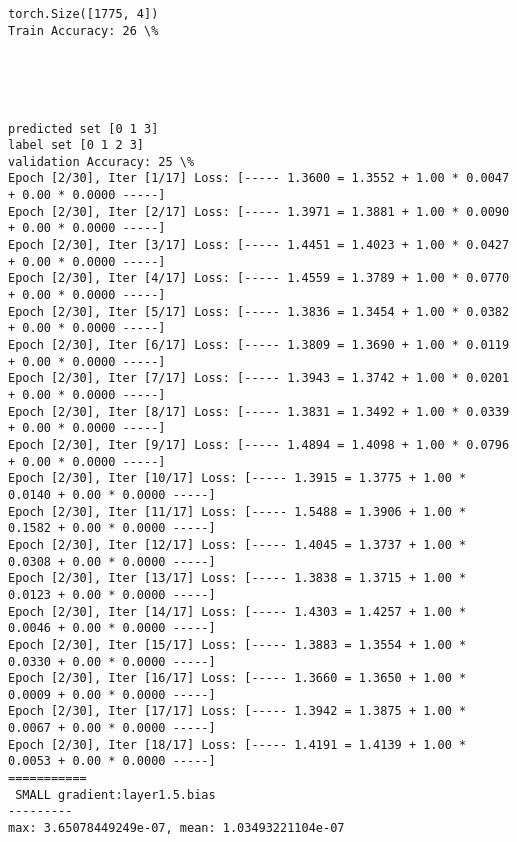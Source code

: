 \documentclass[11pt]{article}
\begin{document}
    \begin{Verbatim}[commandchars=\\\{\}]
torch.Size([1775, 4])
Train Accuracy: 26 \%

    \end{Verbatim}

    \begin{center}
    \end{center}
    { \hspace*{\fill} \\}
    
    \begin{center}
    \end{center}
    { \hspace*{\fill} \\}
    
    \begin{Verbatim}[commandchars=\\\{\}]
predicted set [0 1 3]
label set [0 1 2 3]
validation Accuracy: 25 \%
Epoch [2/30], Iter [1/17] Loss: [----- 1.3600 = 1.3552 + 1.00 * 0.0047 + 0.00 * 0.0000 -----]
Epoch [2/30], Iter [2/17] Loss: [----- 1.3971 = 1.3881 + 1.00 * 0.0090 + 0.00 * 0.0000 -----]
Epoch [2/30], Iter [3/17] Loss: [----- 1.4451 = 1.4023 + 1.00 * 0.0427 + 0.00 * 0.0000 -----]
Epoch [2/30], Iter [4/17] Loss: [----- 1.4559 = 1.3789 + 1.00 * 0.0770 + 0.00 * 0.0000 -----]
Epoch [2/30], Iter [5/17] Loss: [----- 1.3836 = 1.3454 + 1.00 * 0.0382 + 0.00 * 0.0000 -----]
Epoch [2/30], Iter [6/17] Loss: [----- 1.3809 = 1.3690 + 1.00 * 0.0119 + 0.00 * 0.0000 -----]
Epoch [2/30], Iter [7/17] Loss: [----- 1.3943 = 1.3742 + 1.00 * 0.0201 + 0.00 * 0.0000 -----]
Epoch [2/30], Iter [8/17] Loss: [----- 1.3831 = 1.3492 + 1.00 * 0.0339 + 0.00 * 0.0000 -----]
Epoch [2/30], Iter [9/17] Loss: [----- 1.4894 = 1.4098 + 1.00 * 0.0796 + 0.00 * 0.0000 -----]
Epoch [2/30], Iter [10/17] Loss: [----- 1.3915 = 1.3775 + 1.00 * 0.0140 + 0.00 * 0.0000 -----]
Epoch [2/30], Iter [11/17] Loss: [----- 1.5488 = 1.3906 + 1.00 * 0.1582 + 0.00 * 0.0000 -----]
Epoch [2/30], Iter [12/17] Loss: [----- 1.4045 = 1.3737 + 1.00 * 0.0308 + 0.00 * 0.0000 -----]
Epoch [2/30], Iter [13/17] Loss: [----- 1.3838 = 1.3715 + 1.00 * 0.0123 + 0.00 * 0.0000 -----]
Epoch [2/30], Iter [14/17] Loss: [----- 1.4303 = 1.4257 + 1.00 * 0.0046 + 0.00 * 0.0000 -----]
Epoch [2/30], Iter [15/17] Loss: [----- 1.3883 = 1.3554 + 1.00 * 0.0330 + 0.00 * 0.0000 -----]
Epoch [2/30], Iter [16/17] Loss: [----- 1.3660 = 1.3650 + 1.00 * 0.0009 + 0.00 * 0.0000 -----]
Epoch [2/30], Iter [17/17] Loss: [----- 1.3942 = 1.3875 + 1.00 * 0.0067 + 0.00 * 0.0000 -----]
Epoch [2/30], Iter [18/17] Loss: [----- 1.4191 = 1.4139 + 1.00 * 0.0053 + 0.00 * 0.0000 -----]
===========
 SMALL gradient:layer1.5.bias
---------
max: 3.65078449249e-07, mean: 1.03493221104e-07

    \end{Verbatim}
\end{document}
